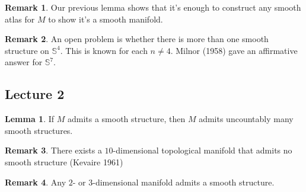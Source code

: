 \documentclass[10pt,letterpaper,cm]{nupset}
\theoremstyle{definition}
\newtheorem{remark}{Remark}
\newtheorem{lemma}{Lemma}
\renewcommand{\S}{\mathbb S}
\newcommand{\1}{\mathbf{1}}
\newcommand{\0}{\vec 0}
\begin{document}
\begin{remark}{Our previous lemma shows that it's enough to construct any smooth atlas for $M$ to show it's a smooth manifold.}
\end{remark}


\begin{remark}{An open problem is whether there is more than one smooth structure on $\S^4$. This is known for each $n \ne 4$. Milnor (1958) gave an affirmative answer for $\S^7$.}
\end{remark}

\subsection{Lecture 2}

\theoremstyle{lemma}
\begin{lemma}{If $M$ admits a smooth structure, then $M$ admits uncountably many smooth structures.} 
\end{lemma}


\begin{remark}{There exists a $10$-dimensional topological manifold that admits no smooth structure (Kevaire 1961)} 
\end{remark}

\begin{remark}{Any $2$- or $3$-dimensional manifold admits a smooth structure.} 
\end{remark}
\end{document}
